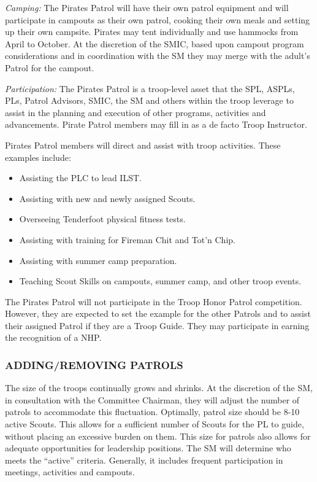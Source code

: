 \documentclass{ltxguide}
\begin{document}
\textit{Camping:} 
The Pirates Patrol will have their own patrol equipment and will participate in campouts as their own patrol, cooking their own meals and setting up their own campsite. Pirates may tent individually and use hammocks from April to October. At the discretion of the SMIC, based upon campout program considerations and in coordination with the \ac{SM} they may merge with the adult's Patrol for the campout.

\textit{Participation:}
The Pirates Patrol is a troop-level asset that the SPL, ASPLs, \acp{PL}, Patrol Advisors, SMIC, the \ac{SM} and others within the troop leverage to assist in the planning and execution of other programs, activities and advancements. Pirate Patrol members may fill in as a de facto Troop Instructor.

Pirates Patrol members will direct and assist with troop activities. These examples include:
\begin{itemize}
	\item Assisting the \ac{PLC} to lead ILST.
	\item Assisting with new and newly assigned Scouts.
	\item Overseeing Tenderfoot physical fitness tests.
	\item Assisting with training for Fireman Chit and Tot'n Chip.
	\item Assisting with summer camp preparation.
	\item Teaching Scout Skills on campouts, summer camp, and other troop events.
\end{itemize}

The Pirates Patrol will not participate in the Troop Honor Patrol competition. However, they are expected to set the example for the other Patrols and to assist their assigned Patrol if they are a Troop Guide. They may participate in earning the recognition of a \ac{NHP}.

\subsubsection{ADDING/REMOVING PATROLS}
The size of the troops continually grows and shrinks. At the discretion of the SM, in consultation with the Committee Chairman, they will adjust the number of patrols to accommodate this fluctuation. Optimally, patrol size should be 8-10 active Scouts. This allows for a sufficient number of Scouts for the \ac{PL} to guide, without placing an excessive burden on them. This size for patrols also allows for adequate opportunities for leadership positions. The \ac{SM} will determine who meets the “active” criteria. Generally, it includes frequent participation in meetings, activities and campouts.
\end{document}
